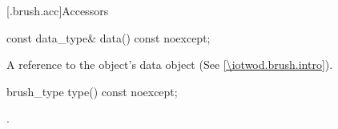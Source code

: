  [\iotwod.brush.acc]{Accessors}

\begin{itemdecl}
const data_type& data() const noexcept;
\end{itemdecl}
\begin{itemdescr}
\pnum
\returns
A reference to the  object's data object (See \ref{\iotwod.brush.intro}).
%
\end{itemdescr}

%
\begin{itemdecl}
brush_type type() const noexcept;
\end{itemdecl}
\begin{itemdescr}
\pnum
\returns
{}.
\end{itemdescr}
